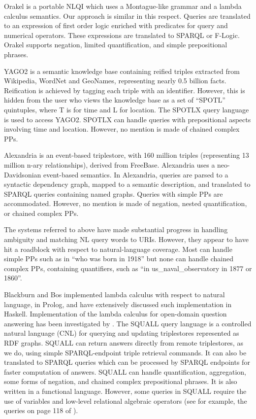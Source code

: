 \documentclass[../main.tex]{subfiles}
\begin{document}
\begin{refsection}
Orakel \cite{cimiano2007orakel} is a portable NLQI which uses a Montague-like grammar and a lambda calculus semantics. Our approach is similar in this respect. Queries are translated to an expression of first order logic enriched with predicates for query and numerical operators. These
expressions are translated to SPARQL or F-Logic. Orakel supports negation, limited quantification, and simple prepositional phrases.

YAGO2 \cite{hoffart2013yago2} is a semantic knowledge base containing reified triples extracted from Wikipedia, WordNet and GeoNames, representing nearly 0.5 billion facts. Reification is achieved by tagging each triple with an identifier. However, this is hidden from the user who views the knowledge base as a set of ``SPOTL'' quintuples, where T is for time and L for location. The SPOTLX query language is used to access YAGO2. SPOTLX can handle queries with prepositional aspects involving time and location. However, no mention is made of chained complex PPs.

Alexandria \cite{wendt2012linguistic} is an event-based triplestore, with 160 million triples (representing 13 million n-ary relationships), derived from FreeBase. Alexandria uses a neo-Davidsonian \cite{parsons1990events} event-based semantics. In Alexandria, queries are parsed to a syntactic dependency graph, mapped to a semantic description, and translated to SPARQL queries containing named graphs. Queries with simple PPs are accommodated. However, no mention is made of negation, nested quantification, or chained complex PPs.

The systems referred to above have made substantial progress in handling ambiguity and matching NL query words to URIs. However, they appear to have hit a roadblock with respect to natural-language coverage. Most can handle simple PPs such as in ``who was born in 1918'' but none can handle chained complex PPs, containing quantifiers, such as ``in us\_naval\_observatory in 1877 or 1860''.

Blackburn and Bos \cite{blackburn2005representation} implemented lambda calculus with respect to natural language, in
Prolog, and \cite{van2010computational} have extensively discussed such implementation in
Haskell. Implementation of the lambda calculus for open-domain question answering has been
investigated by \cite{ahn2005question}.
The SQUALL query language \cite{ferre:squall,ferre2013squall} is a controlled natural language
(CNL) for querying and updating triplestores represented as RDF graphs. SQUALL can return
answers directly from remote triplestores, as we do, using simple SPARQL-endpoint triple
retrieval commands. It can also be translated to SPARQL queries which can be processed by
SPARQL endpoints for faster computation of answers. SQUALL can handle
quantification, aggregation, some forms of negation, and chained complex prepositional phrases.
It is also written in a functional language. However, some queries in SQUALL require the use of
variables and low-level relational algebraic operators (see for example, the queries on page 118
of \cite{ferre2013squall}).


\end{refsection}
\end{document}
